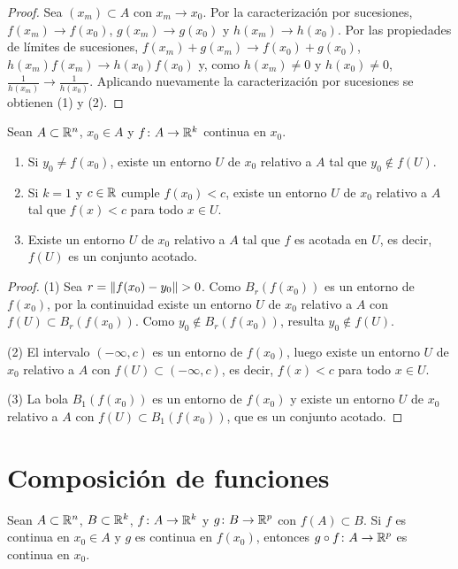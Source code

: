 \begin{proof}
  Sea \({(x_m)} \subset A\) con \(x_m \to x_0\). Por la caracterización por sucesiones, \(f(x_m) \to f(x_0)\), \(g(x_m) \to g(x_0)\) y \(h(x_m) \to h(x_0)\). Por las propiedades de límites de sucesiones, \(f(x_m) + g(x_m) \to f(x_0) + g(x_0)\), \(h(x_m) f(x_m) \to h(x_0) f(x_0)\) y, como \(h(x_m) \neq 0\) y \(h(x_0) \neq 0\), \(\frac{1}{h(x_m)} \to \frac{1}{h(x_0)}\). Aplicando nuevamente la caracterización por sucesiones se obtienen (1) y (2).
\end{proof}

\begin{prop}
  Sean \(A \subset \mathbb{R}^n\), \(x_0 \in A\) y \(f\colon A \to \mathbb{R}^k\) continua en \(x_0\).
  \begin{enumerate}[label=(\arabic*)]
    \item Si \(y_0 \neq f(x_0)\), existe un entorno \(U\) de \(x_0\) relativo a \(A\) tal que \(y_0 \notin f(U)\).
    \item Si \(k = 1\) y \(c \in \mathbb{R}\) cumple \(f(x_0) < c\), existe un entorno \(U\) de \(x_0\) relativo a \(A\) tal que \(f(x) < c\) para todo \(x \in U\).
    \item Existe un entorno \(U\) de \(x_0\) relativo a \(A\) tal que \(f\) es acotada en \(U\), es decir, \(f(U)\) es un conjunto acotado.
  \end{enumerate}
\end{prop}

\begin{proof}
  (1) Sea \(r = \left\lVert f(x_0) - y_0 \right\rVert > 0\). Como \(B_r(f(x_0))\) es un entorno de \(f(x_0)\), por la continuidad existe un entorno \(U\) de \(x_0\) relativo a \(A\) con \(f(U) \subset B_r(f(x_0))\). Como \(y_0 \notin B_r(f(x_0))\), resulta \(y_0 \notin f(U)\).

  (2) El intervalo \((-\infty, c)\) es un entorno de \(f(x_0)\), luego existe un entorno \(U\) de \(x_0\) relativo a \(A\) con \(f(U) \subset (-\infty, c)\), es decir, \(f(x) < c\) para todo \(x \in U\).

  (3) La bola \(B_1(f(x_0))\) es un entorno de \(f(x_0)\) y existe un entorno \(U\) de \(x_0\) relativo a \(A\) con \(f(U) \subset B_1(f(x_0))\), que es un conjunto acotado.
\end{proof}

\section{Composición de funciones}

\begin{theorem}
  Sean \(A \subset \mathbb{R}^n\), \(B \subset \mathbb{R}^k\), \(f\colon A \to \mathbb{R}^k\) y \(g\colon B \to \mathbb{R}^p\) con \(f(A) \subset B\). Si \(f\) es continua en \(x_0 \in A\) y \(g\) es continua en \(f(x_0)\), entonces \(g \circ f\colon A \to \mathbb{R}^p\) es continua en \(x_0\).
\end{theorem}

